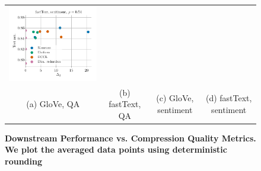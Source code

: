 \begin{figure}
\begin{tabular}{@{\hskip -0.0in}c@{\hskip -0.0in}c@{\hskip -0.0in}c@{\hskip -0.0in}c@{\hskip -0.0in}}
		\includegraphics[width=.245\linewidth]{figures/fasttext1m_sentiment_sst_test-acc_vs_gram-large-dim-delta2-2_linx_det_ave-pt.pdf} \\
		(a) GloVe, QA & (b) fastText, QA  & (c) GloVe, sentiment & (d) fastText, sentiment
	\end{tabular}
	\caption{
		\textbf{Downstream Performance vs. Compression Quality Metrics. We plot the averaged data points using deterministic rounding}}
	\label{fig:bad_correlation_det_ave}
\end{figure}


